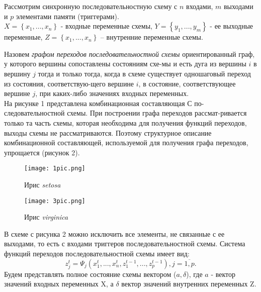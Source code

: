 \documentclass[17pt]{extarticle}
\begin{document}
\newpage

Рассмотрим синхронную последовательностную схему с $n$ входами, $m$ выходами и $p$ элементами памяти (триггерами). \\ $X=\left\{x_1,...,x_n\right\}$ - входные переменные схемы, $Y=\left\{y_1,...,y_m\right\}$ - ее выходные переменные, $Z=\left\{x_1,...,x_n\right\}$ – внутренние переменные схемы.

Назовем \textit{графом переходов последовательностной схемы} ориентированный граф, у которого вершины сопоставлены состояниям схе-мы и есть дуга из вершины $i$ в вершину $j$ тогда и только тогда, когда в схеме существует одношаговый переход из состояния, соответствую-щего вершине $i$, в состояние, соответствующее вершине $j$, при каких-либо значениях входных переменных.
\\
\indent На рисунке 1 представлена комбинационная составляющая С по-следовательностной схемы. При построении графа переходов рассмат-ривается только та часть схемы, которая необходима для получения функций переходов, выходы схемы не рассматриваются. Поэтому структурное описание комбинационной составляющей, используемой для получения графа переходов, упрощается (рисунок 2). 


\begin{figure}[h]
    \begin{minipage}{0.45\textwidth} 
        \texttt{[image: 1pic.png]} 
        \caption{Ирис \textit{setosa}}
        \label{fig:left}
    \end{minipage}
    \hfill 
    \begin{minipage}{0.45\textwidth} 
        \texttt{[image: 3pic.png]} 
        \raggedleft
        \caption{Ирис \textit{virginica}}
        \label{fig:right}
    \end{minipage}
\end{figure}

В схеме с рисунка 2 можно исключить все элементы, не связанные с ее выходами, то есть с входами триггеров последовательностной схемы.
Система функций переходов последовательностной схемы имеет вид:
\begin{equation}
    z_j^t = \Psi_j(x_1^t,...,x_n^t,z_1^{t-1},...,z_p^{t-1}), j=\overline{1,p}.
\end{equation}
Будем представлять полное состояние схемы вектором ($a,\delta$), где $a$ - вектор значений входных переменных X, а $\delta$ вектор значений внутренних переменных Z.
\end{document}

